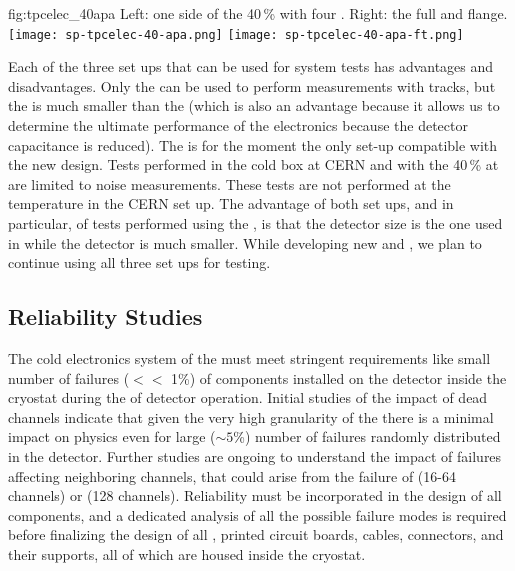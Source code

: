 \begin{dunefigure}
{fig:tpcelec_40apa}
{Left: one side of the \num{40}\,\%  with four .  Right: the full  \fdth and flange.}
\texttt{[image: sp-tpcelec-40-apa.png]}
\hspace{3mm}
\texttt{[image: sp-tpcelec-40-apa-ft.png]}
\end{dunefigure}

Each of the three set ups that can be used for system tests has advantages
and disadvantages. Only the   can be used to 
perform measurements with tracks, but the  is 
much smaller than the    (which is also an advantage because it
allows us to determine the ultimate performance of the electronics because
the detector capacitance is reduced). The  
is for the moment the only set-up compatible with the new 
design. Tests performed in the cold box at CERN and with the \num{40}\,\%  
at  are limited to noise measurements. These tests are not
performed at the  temperature in the CERN set up. The advantage of
both set ups, and in particular, of tests performed using the 
, is that the detector size is the one used in  while the  detector is
much smaller. While developing
new  and , we plan to continue using all
three set ups for testing.

\subsection{Reliability Studies}
\label{sec:fdsp-tpcelec-qa-reliability}


The  cold electronics system of the    must meet 
stringent requirements like small number of failures ($<<$ 1\%) of components installed 
on the detector inside the cryostat during the \dunelifetime of 
detector operation. Initial studies of the impact of dead channels indicate
that given the very high granularity of the  there is a minimal
impact on physics even for large ($\sim5$\%) number of failures randomly distributed
in the detector. Further studies are ongoing to understand the impact of failures 
affecting neighboring channels, that could arise from the failure of  
(16-64 channels) or  (128 channels). Reliability must be incorporated in the 
design of all components, and a dedicated analysis of all the possible failure modes is required 
before finalizing the design of all , printed circuit boards, cables, 
connectors, and their supports, all of which are housed inside the   
cryostat. 

